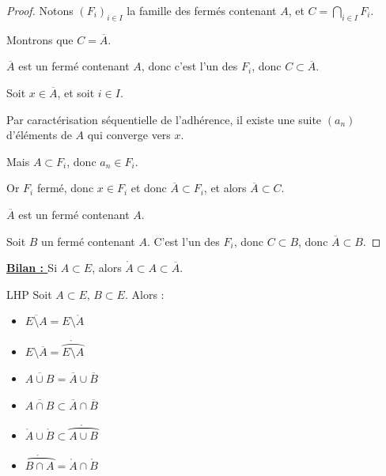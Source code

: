 \begin{proof}
    Notons $(F_i)_{i \in I}$ la famille des fermés contenant $A$, et
    $ \displaystyle C = \bigcap_{i \in I} F_i$.

    Montrons que $C = \overline A$.

    $\overline A$ est un fermé contenant $A$, donc c'est l'un des $F_i$, donc $ C \subset \overline{A}$.

    Soit $x \in \overline{A}$, et soit $i \in I$. 

    Par caractérisation séquentielle de l'adhérence, il existe une suite $(a_n)$ d'éléments de $A$ qui converge vers $x$.

    Mais $A \subset F_i$, donc $a_n \in F_i$.

    Or $F_i$ fermé, donc $x \in F_i$ et donc $\overline A \subset F_i$, 
    et alors $\overline A \subset C$.

    $\overline A$ est un fermé contenant $A$. 

    Soit $B$ un fermé contenant $A$. C'est l'un des $F_i$, donc $C \subset B$, 
    donc $\overline A \subset B$.
\end{proof}

\textbf{\uline{Bilan : }}
Si $A \subset E$, alors $\mathring A \subset A \subset \overline A$.


\begin{proposition}{LHP}{}
    Soit $A \subset E, \, B \subset E$. Alors :
    \begin{itemize}
        \item $\overline{E \setminus A} = E \setminus \mathring{A}$
        \item $E \setminus \overline A = \mathring{\overparen{E \setminus A}}$
        \item $\overline{A \cup B} = \overline{A} \cup \overline{B}$
        \item $\overline{A \cap B} \subset \overline{A} \cap \overline{B}$
        \item $\mathring A \cup \mathring B \subset \mathring{\overparen{A \cup B}}$ 
        \item $\mathring{\overparen{B \cap A}} = \mathring A \cap \mathring B$
    \end{itemize}
\end{proposition}


